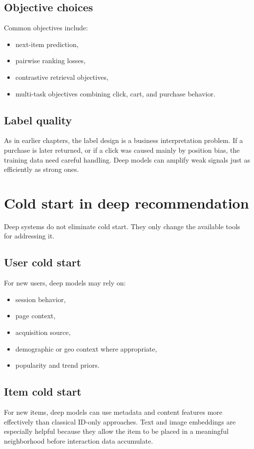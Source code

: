 \subsection{Objective choices}
Common objectives include:
\begin{itemize}
  \item next-item prediction,
  \item pairwise ranking losses,
  \item contrastive retrieval objectives,
  \item multi-task objectives combining click, cart, and purchase behavior.
\end{itemize}

\subsection{Label quality}
As in earlier chapters, the label design is a business interpretation problem.
If a purchase is later returned, or if a click was caused mainly by position bias, the training data need careful handling.
Deep models can amplify weak signals just as efficiently as strong ones.

\section{Cold start in deep recommendation}
Deep systems do not eliminate cold start.
They only change the available tools for addressing it.

\subsection{User cold start}
For new users, deep models may rely on:
\begin{itemize}
  \item session behavior,
  \item page context,
  \item acquisition source,
  \item demographic or geo context where appropriate,
  \item popularity and trend priors.
\end{itemize}

\subsection{Item cold start}
For new items, deep models can use metadata and content features more effectively than classical ID-only approaches.
Text and image embeddings are especially helpful because they allow the item to be placed in a meaningful neighborhood before interaction data accumulate.

